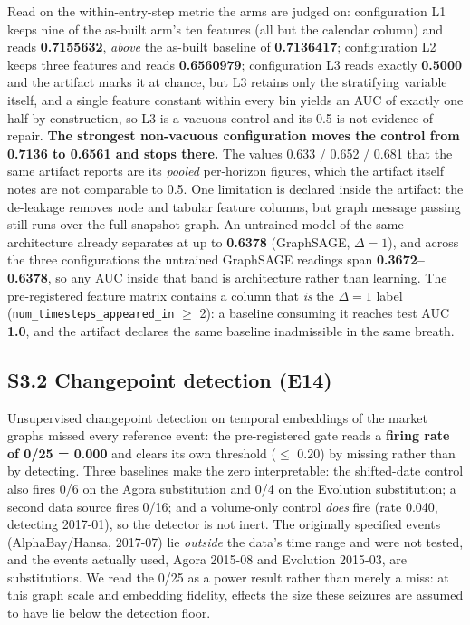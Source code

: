 \documentclass[11pt,a4paper]{article}
\begin{document}
Read on the within-entry-step metric the arms are judged on: configuration L1
keeps nine of the as-built arm's ten features (all but the calendar column) and
reads \textbf{0.7155632}, \emph{above} the as-built baseline of
\textbf{0.7136417}; configuration L2 keeps three features and reads
\textbf{0.6560979}; configuration L3 reads exactly \textbf{0.5000} and the
artifact marks it at chance, but L3 retains only the stratifying variable itself,
and a single feature constant within every bin yields an AUC of exactly one half
by construction, so L3 is a vacuous control and its 0.5 is not evidence of
repair. \textbf{The strongest non-vacuous configuration moves the control from
0.7136 to 0.6561 and stops there.} The values 0.633 / 0.652 / 0.681 that the
same artifact reports are its \emph{pooled} per-horizon figures, which the
artifact itself notes are not comparable to 0.5. One limitation is declared
inside the artifact: the de-leakage removes node and tabular feature columns,
but graph message passing still runs over the full snapshot graph. An untrained
model of the same architecture already separates at up to \textbf{0.6378}
(GraphSAGE, $\Delta = 1$), and across the three configurations the untrained
GraphSAGE readings span \textbf{0.3672--0.6378}, so any AUC inside that band is
architecture rather than learning. The pre-registered feature matrix contains a
column that \emph{is} the $\Delta = 1$ label
(\texttt{num\_timesteps\_appeared\_in} $\geq$ 2): a baseline consuming it reaches
test AUC \textbf{1.0}, and the artifact declares the same baseline inadmissible
in the same breath.

\subsection*{S3.2 Changepoint detection (E14)}

Unsupervised changepoint detection on temporal embeddings of the market graphs
missed every reference event: the pre-registered gate reads a \textbf{firing rate
of 0/25 = 0.000} and clears its own threshold ($\leq$ 0.20) by missing rather
than by detecting. Three baselines make the zero interpretable: the shifted-date
control also fires 0/6 on the Agora substitution and 0/4 on the Evolution
substitution; a second data source fires 0/16; and a volume-only control
\emph{does} fire (rate 0.040, detecting 2017-01), so the detector is not inert.
The originally specified events (AlphaBay/Hansa, 2017-07) lie \emph{outside} the
data's time range and were not tested, and the events actually used, Agora
2015-08 and Evolution 2015-03, are substitutions. We read the 0/25 as a power
result rather than merely a miss: at this graph scale and embedding fidelity,
effects the size these seizures are assumed to have lie below the detection
floor.
\end{document}
